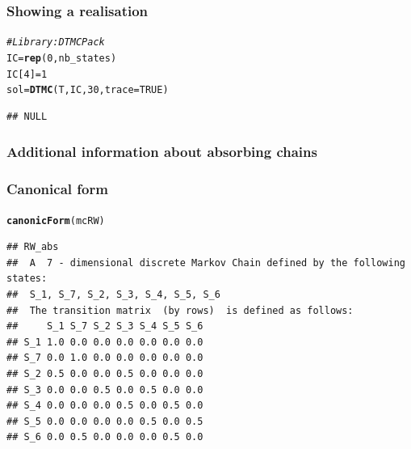 \documentclass[aspectratio=169]{beamer}\usepackage[]{graphicx}\usepackage[]{xcolor}
\makeatletter
\newcommand{\hlnum}[1]{\textcolor[rgb]{0.686,0.059,0.569}{#1}}%
\newcommand{\hlcom}[1]{\textcolor[rgb]{0.678,0.584,0.686}{\textit{#1}}}%
\newcommand{\hldef}[1]{\textcolor[rgb]{0.345,0.345,0.345}{#1}}%
\newcommand{\hlkwb}[1]{\textcolor[rgb]{0.69,0.353,0.396}{#1}}%
\newcommand{\hlkwc}[1]{\textcolor[rgb]{0.333,0.667,0.333}{#1}}%
\newcommand{\hlkwd}[1]{\textcolor[rgb]{0.737,0.353,0.396}{\textbf{#1}}}%
\newenvironment{kframe}{%
 \def\at@end@of@kframe{}%
 \ifinner\ifhmode%
  \def\at@end@of@kframe{\end{minipage}}%
  \begin{minipage}{\columnwidth}%
 \fi\fi%
 \def\FrameCommand##1{\hskip\@totalleftmargin \hskip-\fboxsep
 \colorbox{shadecolor}{##1}\hskip-\fboxsep
     \hskip-\linewidth \hskip-\@totalleftmargin \hskip\columnwidth}%
 \MakeFramed {\advance\hsize-\width
   \@totalleftmargin\z@ \linewidth\hsize
   \@setminipage}}%
 {\par\unskip\endMakeFramed%
 \at@end@of@kframe}
\newenvironment{knitrout}{}{} %
\makeatother
\begin{document}
\begin{frame}[fragile]\frametitle{Showing a realisation}
\begin{knitrout}
\color{fgcolor}\begin{kframe}
\begin{alltt}
\hlcom{# Library: DTMCPack}
\hldef{IC} \hlkwb{=} \hlkwd{rep}\hldef{(}\hlnum{0}\hldef{, nb_states)}
\hldef{IC[}\hlnum{4}\hldef{]} \hlkwb{=} \hlnum{1}
\hldef{sol} \hlkwb{=} \hlkwd{DTMC}\hldef{(T, IC,} \hlnum{30}\hldef{,} \hlkwc{trace}\hldef{=}\hlnum{TRUE}\hldef{)}
\end{alltt}
\begin{verbatim}
## NULL
\end{verbatim}
\end{kframe}
\end{knitrout}
\end{frame}


\begin{frame}\frametitle{Additional information about absorbing chains}
\vfill
{}
\vfill
{}
\vfill
{}
\end{frame}

\begin{frame}[fragile]\frametitle{Canonical form}
\begin{knitrout}
\color{fgcolor}\begin{kframe}
\begin{alltt}
\hlkwd{canonicForm}\hldef{(mcRW)}
\end{alltt}
\begin{verbatim}
## RW_abs 
##  A  7 - dimensional discrete Markov Chain defined by the following states: 
##  S_1, S_7, S_2, S_3, S_4, S_5, S_6 
##  The transition matrix  (by rows)  is defined as follows: 
##     S_1 S_7 S_2 S_3 S_4 S_5 S_6
## S_1 1.0 0.0 0.0 0.0 0.0 0.0 0.0
## S_7 0.0 1.0 0.0 0.0 0.0 0.0 0.0
## S_2 0.5 0.0 0.0 0.5 0.0 0.0 0.0
## S_3 0.0 0.0 0.5 0.0 0.5 0.0 0.0
## S_4 0.0 0.0 0.0 0.5 0.0 0.5 0.0
## S_5 0.0 0.0 0.0 0.0 0.5 0.0 0.5
## S_6 0.0 0.5 0.0 0.0 0.0 0.5 0.0
\end{verbatim}
\end{kframe}
\end{knitrout}
\end{frame}
\end{document}
